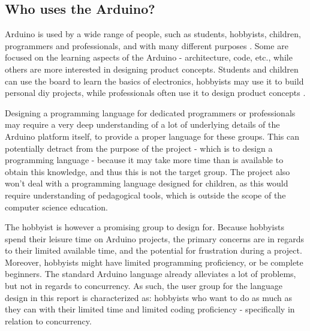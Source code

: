 \subsection{Who uses the Arduino?}\label{subsec:whouses}
Arduino is used by a wide range of people, such as students, hobbyists, children, programmers and professionals, and with many different purposes \cite{WhatArduino}. Some are focused on the learning aspects of the Arduino - architecture, code, etc., while others are more interested in designing product concepts. Students and children can use the board to learn the basics of electronics, hobbyists may use it to build personal \gls{diy} projects, while professionals often use it to design product concepts \cite{WhatArduino}.

Designing a programming language for dedicated programmers or professionals may require a very deep understanding of a lot of underlying details of the Arduino platform itself, to provide a proper language for these groups. This can potentially detract from the purpose of the project - which is to design a programming language - because it may take more time than is available to obtain this knowledge, and thus this is not the target group. The project also won't deal with a programming language designed for children, as this would require understanding of pedagogical tools, which is outside the scope of the computer science education.

The hobbyist is however a promising group to design for. Because hobbyists spend their leisure time on Arduino projects, the primary concerns are in regards to their limited available time, and the potential for frustration during a project. Moreover, hobbyists might have limited programming proficiency, or be complete beginners. The standard Arduino language already alleviates a lot of problems, but not in regards to concurrency. As such, the user group for the language design in this report is characterized as: hobbyists who want to do as much as they can with their limited time and limited coding proficiency - specifically in relation to concurrency.

